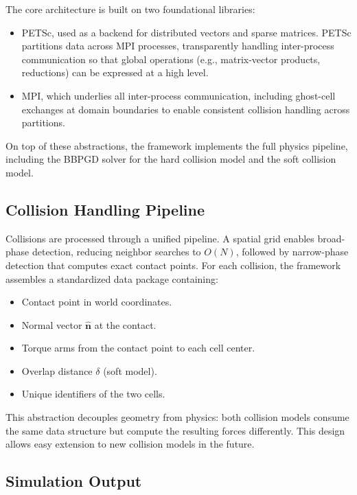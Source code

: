 \documentclass[conference]{IEEEtran}
\begin{document}
The core architecture is built on two foundational libraries:
\begin{itemize}
    \item PETSc\cite{petsc-web-page}, used as a backend for distributed vectors and sparse matrices. PETSc partitions data across MPI processes, transparently handling inter-process communication so that global operations (e.g., matrix-vector products, reductions) can be expressed at a high level.
    \item MPI, which underlies all inter-process communication, including ghost-cell exchanges at domain boundaries to enable consistent collision handling across partitions.
\end{itemize}

On top of these abstractions, the framework implements the full physics pipeline, including the BBPGD solver for the hard collision model \cite{Weady2024} and the soft collision model.


\subsection{Collision Handling Pipeline}

Collisions are processed through a unified pipeline. A spatial grid enables broad-phase detection, reducing neighbor searches to $O(N)$, followed by narrow-phase detection that computes exact contact points. For each collision, the framework assembles a standardized data package containing:

\begin{itemize}
    \item Contact point in world coordinates.
    \item Normal vector $\hat{\mathbf{n}}$ at the contact.
    \item Torque arms from the contact point to each cell center.
    \item Overlap distance $\delta$ (soft model).
    \item Unique identifiers of the two cells.
\end{itemize}

This abstraction decouples geometry from physics: both collision models consume the same data structure but compute the resulting forces differently. This design allows easy extension to new collision models in the future.

\subsection{Simulation Output}
\end{document}
